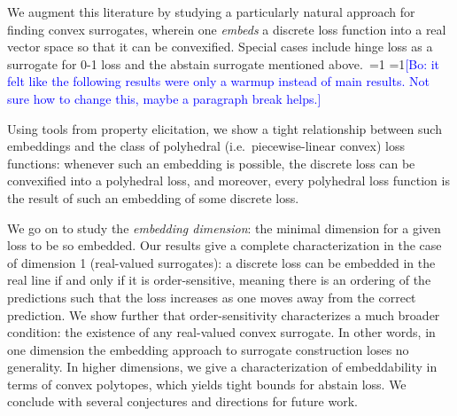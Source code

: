 \documentclass[anon,12pt]{colt2019}
\newcommand{\Comments}{1}
\newcommand{\mynote}[2]{\ifnum\Comments=1\textcolor{#1}{#2}\fi}
\newcommand{\mytodo}[2]{\ifnum\Comments=1%
  \todo[linecolor=#1!80!black,backgroundcolor=#1,bordercolor=#1!80!black]{#2}\fi}
\newcommand{\raft}[1]{\mytodo{green!20!white}{RF: #1}}
\newcommand{\bo}[1]{\mynote{blue}{[Bo: #1]}}
\begin{document}
We augment this literature by studying a particularly natural approach for finding convex surrogates, wherein one \emph{embeds} a discrete loss function into a real vector space so that it can be convexified.
Special cases include hinge loss as a surrogate for 0-1 loss and the abstain surrogate mentioned above.~\cite{crammer2001algorithmic}\raft{cite}
\bo{it felt like the following results were only a warmup instead of main results. Not sure how to change this, maybe a paragraph break helps.}

Using tools from property elicitation, we show a tight relationship between such embeddings and the class of polyhedral (i.e.\ piecewise-linear convex) loss functions: whenever such an embedding is possible, the discrete loss can be convexified into a polyhedral loss, and moreover, every polyhedral loss function is the result of such an embedding of some discrete loss.

We go on to study the \emph{embedding dimension}: the minimal dimension for a given loss to be so embedded.
Our results give a complete characterization in the case of dimension 1 (real-valued surrogates):
a discrete loss can be embedded in the real line if and only if it is order-sensitive, meaning there is an ordering of the predictions such that the loss increases as one moves away from the correct prediction.
We show further that order-sensitivity characterizes a much broader condition: the existence of any real-valued convex surrogate.
In other words, in one dimension the embedding approach to surrogate construction loses no generality.
In higher dimensions, we give a characterization of embeddability in terms of convex polytopes, which yields tight bounds for abstain loss.
We conclude with several conjectures and directions for future work.
\end{document}
